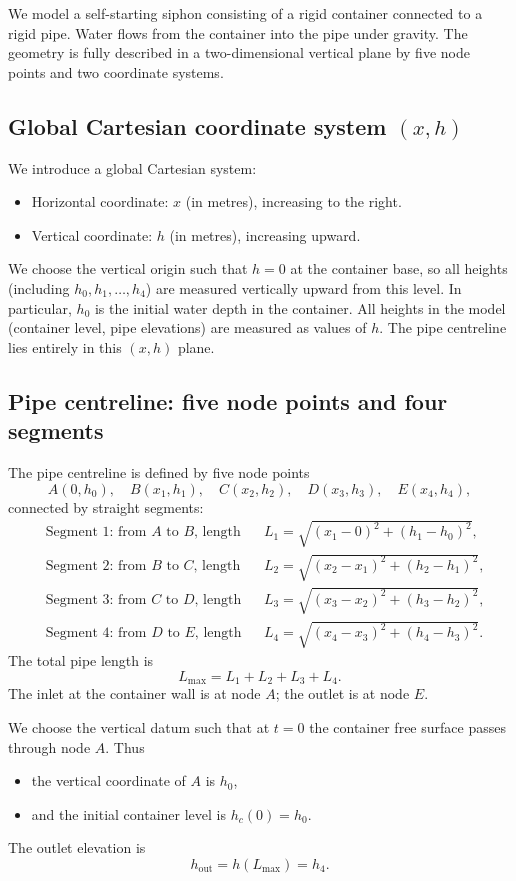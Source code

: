 \documentclass[11pt]{article}
\begin{document}
We model a self-starting siphon consisting of a rigid container connected to a rigid pipe.
Water flows from the container into the pipe under gravity. The geometry is fully described
in a two-dimensional vertical plane by five node points and two coordinate systems.

\subsection{Global Cartesian coordinate system $(x,h)$}

We introduce a global Cartesian system:
\begin{itemize}
  \item Horizontal coordinate: $x$ (in metres), increasing to the right.
  \item Vertical coordinate: $h$ (in metres), increasing upward.
\end{itemize}
We choose the vertical origin such that $h=0$ at the container base, so all heights (including $h_0,h_1,\dots,h_4$) are measured vertically upward from this level. In particular, $h_0$ is the initial water depth in the container.
All heights in the model (container level, pipe elevations) are measured as values of $h$.
The pipe centreline lies entirely in this $(x,h)$ plane.

\subsection{Pipe centreline: five node points and four segments}

The pipe centreline is defined by five node points
\[
A(0,h_0),\quad B(x_1,h_1),\quad C(x_2,h_2),\quad D(x_3,h_3),\quad E(x_4,h_4),
\]
connected by straight segments:
\begin{align*}
  &\text{Segment 1: from $A$ to $B$, length} &&
    L_1 = \sqrt{(x_1 - 0)^2 + (h_1 - h_0)^2},\\
  &\text{Segment 2: from $B$ to $C$, length} &&
    L_2 = \sqrt{(x_2 - x_1)^2 + (h_2 - h_1)^2},\\
  &\text{Segment 3: from $C$ to $D$, length} &&
    L_3 = \sqrt{(x_3 - x_2)^2 + (h_3 - h_2)^2},\\
  &\text{Segment 4: from $D$ to $E$, length} &&
    L_4 = \sqrt{(x_4 - x_3)^2 + (h_4 - h_3)^2}.
\end{align*}
The total pipe length is
\[
  L_{\max} = L_1 + L_2 + L_3 + L_4.
\]
The inlet at the container wall is at node $A$; the outlet is at node $E$.

We choose the vertical datum such that at $t=0$ the container free surface passes through
node $A$. Thus
\begin{itemize}
  \item the vertical coordinate of $A$ is $h_0$,
  \item and the initial container level is $h_c(0) = h_0$.
\end{itemize}
The outlet elevation is
\[
  h_{\text{out}} = h(L_{\max}) = h_4.
\]
\end{document}

